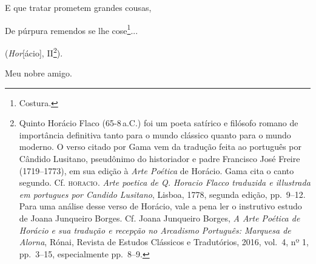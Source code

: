 E que tratar prometem grandes cousas,

De púrpura remendos se lhe cose\footnote{ Costura.}...

(\emph{Hor}{[}ácio{]}, II\footnote{ Quinto Horácio Flaco (65-8\,a.C.) 
foi um poeta satírico e filósofo romano de importância
  definitiva tanto para o mundo clássico quanto para o mundo moderno. O
  verso citado por Gama vem da tradução feita ao português por Cândido
  Lusitano, pseudônimo do historiador e padre Francisco José Freire
  (1719--1773), em sua edição à \emph{Arte Poética} de Horácio. Gama cita
  o canto segundo. Cf. \textsc{horacio}. \emph{Arte poetica de Q. Horacio Flacco
  traduzida e illustrada em portugues por Candido Lusitano}, Lisboa,
  1778, segunda edição, pp.~9--12. Para uma análise desse verso de
  Horácio, vale a pena ler o instrutivo estudo de Joana Junqueiro
  Borges. Cf. Joana Junqueiro Borges, \emph{A Arte Poética de Horácio e
  sua tradução e recepção no Arcadismo Português: Marquesa de Alorna},
  Rónai, Revista de Estudos Clássicos e Tradutórios, 2016, vol.~4, nº 1,
  pp.~3--15, especialmente pp.~8--9.}).

Meu nobre amigo.

